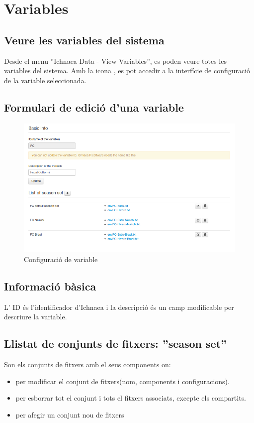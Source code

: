 \section{Variables}
\subsection{Veure les variables del sistema}
Desde el menu ''Ichnaea  Data - View Variables'', es poden veure totes les variables del sistema. Amb la icona \iconeyeopen, es pot accedir a la interfície de configuraci\'{o} de la variable seleccionada.

\subsection{Formulari de edici\'{o} d'una variable}
\begin{figure}[h!]
  \centering
  \includegraphics[scale=0.5]{img/userguide/variable_configuration.png}
  \caption{Configuraci\'{o} de variable}
  \label{fig:placement}
\end{figure}
\subsection*{Informació bàsica}
L' ID \'{e}s l'identificador d'Ichnaea i la descripció \'{e}s un camp modificable per descriure la variable.
\subsection{Llistat de conjunts de fitxers: ''season set''}
Son els conjunts de fitxers amb el seus components on:
\begin{itemize}
\item \iconedit per modificar el conjunt de fitxers(nom, components i configuracions).
\item \icontrash per esborrar tot el conjunt i tots el fitxers associats, excepte els compartits.
\item \iconadd per afegir un conjunt nou de fitxers
\end{itemize}

